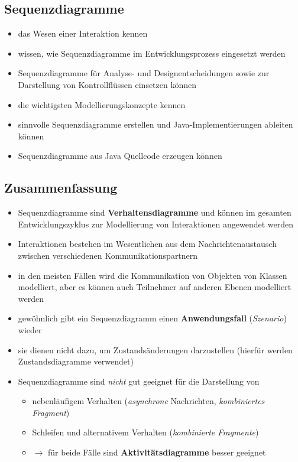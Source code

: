 \subsection*{Sequenzdiagramme}
\begin{itemize}
    \item das Wesen einer Interaktion kennen
    \item wissen, wie Sequenzdiagramme im Entwicklungsprozess eingesetzt werden
    \item Sequenzdiagramme für Analyse- und Designentscheidungen sowie zur Darstellung von Kontrollflüssen einsetzen können
    \item die wichtigsten Modellierungskonzepte kennen
    \item sinnvolle Sequenzdiagramme erstellen und Java-Implementierungen ableiten können
    \item Sequenzdiagramme aus Java Quellcode erzeugen können
\end{itemize}

\subsection*{Zusammenfassung}

\begin{itemize}
    \item Sequenzdiagramme sind \textbf{Verhaltensdiagramme}
    und können im gesamten Entwicklungszyklus zur Modellierung von Interaktionen angewendet werden
    \item Interaktionen bestehen im Wesentlichen aus dem Nachrichtenaustausch zwischen verschiedenen Kommunikationspartnern
    \item in den meisten Fällen wird die Kommunikation von Objekten von Klassen modelliert, aber es können auch Teilnehmer auf anderen Ebenen modelliert werden
    \item gewöhnlich gibt ein Sequenzdiagramm einen \textbf{Anwendungsfall} (\textit{Szenario}) wieder
    \item sie dienen nicht dazu, um Zustandsänderungen darzustellen (hierfür werden Zustandsdiagramme verwendet)
    \item Sequenzdiagramme sind \textit{nicht} gut geeignet für die Darstellung von
    \begin{itemize}
        \item nebenläufigem Verhalten (\textit{asynchrone} Nachrichten, \textit{kombiniertes Fragment})
        \item Schleifen und alternativem Verhalten (\textit{kombinierte Fragmente})
        \item[] $\rightarrow$  für beide Fälle sind \textbf{Aktivitätsdiagramme} besser geeignet
    \end{itemize}
\end{itemize}

